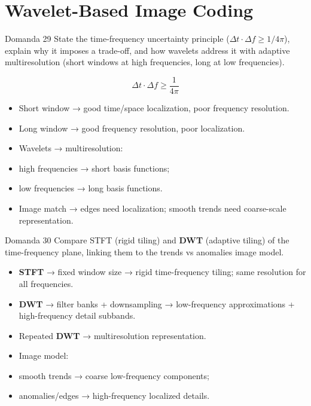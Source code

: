 \section{Wavelet-Based Image Coding}




\begin{questionbox}{Domanda 29}
State the time-frequency uncertainty principle ($\Delta t \cdot \Delta f \geq 1/4\pi$), explain why it imposes a trade-off, and how wavelets address it with adaptive multiresolution (short windows at high frequencies, long at low frequencies).
\end{questionbox}



$$
\Delta t \cdot \Delta f \geq \frac{1}{4\pi}
$$


\begin{itemize}
  \item Short window → good time/space localization, poor frequency resolution.
  \item Long window → good frequency resolution, poor localization.
  \item Wavelets → multiresolution:
  \item high frequencies → short basis functions;
  \item low frequencies → long basis functions.
  \item Image match → edges need localization; smooth trends need coarse-scale representation.
\end{itemize}



\begin{questionbox}{Domanda 30}
Compare STFT (rigid tiling) and \textbf{DWT} (adaptive tiling) of the time-frequency plane, linking them to the trends vs anomalies image model.
\end{questionbox}


\begin{itemize}
  \item \textbf{STFT} → fixed window size → rigid time-frequency tiling; same resolution for all frequencies.
  \item \textbf{\textbf{DWT}} → filter banks + downsampling → low-frequency approximations + high-frequency detail subbands.
  \item Repeated \textbf{DWT} → multiresolution representation.
  \item Image model:
  \item smooth trends → coarse low-frequency components;
  \item anomalies/edges → high-frequency localized details.
\end{itemize}



